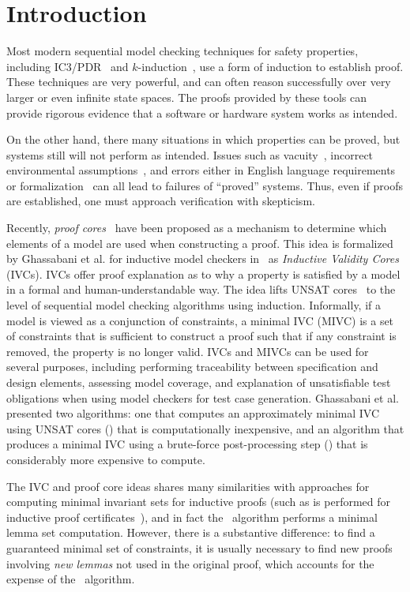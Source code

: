 \section{Introduction}
\label{sec:intro}
Most modern sequential model checking techniques for safety properties, including IC3/PDR~\cite{Een2011:PDR} and $k$-induction~\cite{SheeranSS00}, use a form of induction to establish proof.  These techniques are very powerful, and can often reason successfully over very larger or even infinite state spaces.  The proofs provided by these tools can provide rigorous evidence that a software or hardware system works as intended.

On the other hand, there many situations in which properties can be proved, but systems still will not perform as intended.  Issues such as vacuity~\cite{Kupferman03:Vacuity}, incorrect environmental assumptions~\cite{Whalen07:FMICS}, and errors either in English language requirements or formalization~\cite{Pike06:axioms} can all lead to failures of ``proved'' systems.  Thus, even if proofs are established, one must approach verification with skepticism.

Recently, {\em proof cores}~\cite{jasper_gold} have been proposed as a mechanism to determine which elements of a model are used when constructing a proof.  This idea is formalized by Ghassabani et al. for inductive model checkers in~\cite{Ghass16} as {\em Inductive Validity Cores} (IVCs). IVCs offer proof explanation as to why a property is satisfied by a model in a formal and human-understandable way.  The idea lifts UNSAT cores~\cite{zhang2003extracting}
to the level of sequential model checking algorithms using induction.  Informally, if a model is viewed as a conjunction of constraints,
a minimal IVC (MIVC) is a set of constraints that is sufficient to construct a proof such that if any constraint is removed, the property is no longer valid.
%
IVCs and MIVCs can be used for several purposes, including performing traceability between specification and design elements, assessing model coverage, and explanation of unsatisfiable test obligations when using model checkers for test case generation. Ghassabani et al.~\cite{Ghass16} presented two algorithms: one that computes an approximately minimal IVC using UNSAT cores (\ucalg) that is computationally inexpensive, and an algorithm that produces a
minimal IVC using a brute-force post-processing step (\ucbfalg) that is considerably more expensive to compute.

The IVC and proof core ideas shares many similarities with approaches for computing minimal invariant sets for inductive proofs (such as is performed for inductive proof certificates~\cite{piskac2016, ivrii2014small}), and in fact the \ucalg\ algorithm performs a minimal lemma set computation.  However, there is a substantive difference: to find a guaranteed minimal set of constraints, it is usually necessary to find new proofs involving {\em new lemmas} not used in the original proof, which accounts for the expense of the \ucbfalg\ algorithm.

